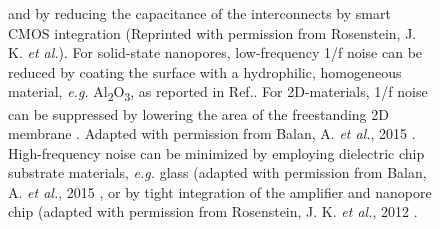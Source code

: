 \begin{figure}[H]
{		and by reducing the capacitance of the interconnects by smart CMOS integration (Reprinted with permission from Rosenstein, J. K. \emph{et al.}).
		For solid-state nanopores, low-frequency 1/f noise can be reduced by coating the surface with a hydrophilic, homogeneous material, \emph{e.g.} Al\textsubscript{2}O\textsubscript{3}, as reported in Ref.\cite{Chen2004}. For 2D-materials, 1/f noise can be suppressed by lowering the area of the freestanding 2D membrane . Adapted with permission from Balan, A. \emph{et al.}, 2015 \cite{Balan2015}.
		High-frequency noise can be minimized by employing dielectric chip substrate materials, \emph{e.g.} glass (adapted with permission from Balan, A. \emph{et al.}, 2015 \cite{Balan2015},
		or by tight integration of the amplifier and nanopore chip (adapted with permission from Rosenstein, J. K. \emph{et al.}, 2012 \cite{Rosenstein2012}.
	}
	\label{fig:fig3.5}
\end{figure}

